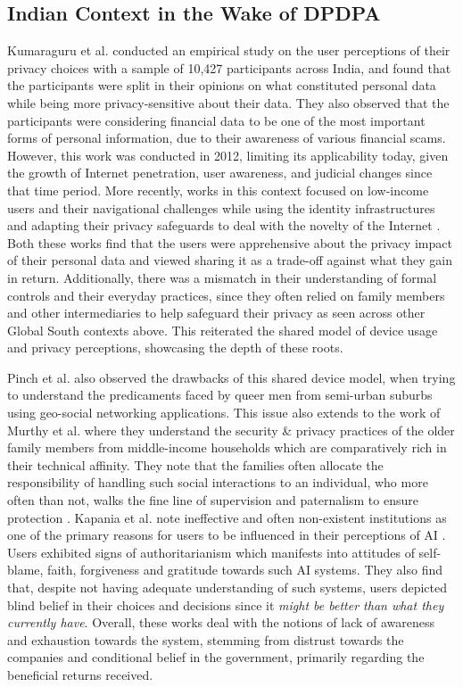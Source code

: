 \subsection{Indian Context in the Wake of DPDPA} \label{subsec:indian context}
Kumaraguru et al. \cite{kumaraguru_privacy_2012} conducted an empirical study on the user perceptions of their privacy choices with a sample of 10,427 participants across India, and found that the participants were split in their opinions on what constituted personal data while being more privacy-sensitive about their data. They also observed that the participants were considering financial data to be one of the most important forms of personal information, due to their awareness of various financial scams. However, this work was conducted in 2012, limiting its applicability today, given the growth of Internet penetration, user awareness, and judicial changes since that time period. More recently, works in this context focused on low-income users and their navigational challenges while using the identity infrastructures \cite{srinivasan2018poverty} and adapting their privacy safeguards to deal with the novelty of the Internet \cite{popuri_i_nodate}. Both these works find that the users were apprehensive about the privacy impact of their personal data and viewed sharing it as a trade-off against what they gain in return. Additionally, there was a mismatch in their understanding of formal controls and their everyday practices, since they often relied on family members and other intermediaries to help safeguard their privacy as seen across other Global South contexts above. This reiterated the shared model of device usage and privacy perceptions, showcasing the depth of these roots. 

Pinch et al. \cite{pinch_someone_2022} also observed the drawbacks of this shared device model, when trying to understand the predicaments faced by queer men from semi-urban suburbs using geo-social networking applications. This issue also extends to the work of Murthy et al. where they understand the security \& privacy practices of the older family members from middle-income households which are comparatively rich in their technical affinity. They note that the families often allocate the responsibility of handling such social interactions to an individual, who more often than not, walks the fine line of supervision and paternalism to ensure protection \cite{murthy_individually_2021}. Kapania et al. note ineffective and often non-existent institutions as one of the primary reasons for users to be influenced in their perceptions of AI \cite{kapania_because_2022}. Users exhibited signs of authoritarianism which manifests into attitudes of self-blame, faith, forgiveness and gratitude towards such AI systems. They also find that, despite not having adequate understanding of such systems, users depicted blind belief in their choices and decisions since it \textit{might be better than what they currently have}. Overall, these works deal with the notions of lack of awareness and exhaustion towards the system, stemming from distrust towards the companies and conditional belief in the government, primarily regarding the beneficial returns received. 

